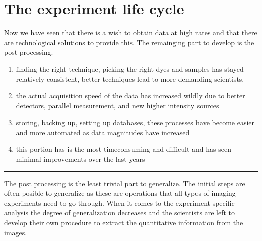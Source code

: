 \documentclass[letterpaper,10pt,english]{sphinxmanual}
\begin{document}
\section{The experiment life cycle}
\label{\detokenize{01-Introduction:the-experiment-life-cycle}}
\sphinxAtStartPar
Now we have seen that there is a wish to obtain data at high rates and that there are technological solutions to provide this. The remainging part to develop is the post processing.
\begin{enumerate}
%
\item {} 
\sphinxAtStartPar
{} finding the right technique, picking the right dyes and samples has stayed relatively consistent, better techniques lead to more demanding scientists.

\item {} 
\sphinxAtStartPar
{} the actual acquisition speed of the data has increased wildly due to better detectors, parallel measurement, and new higher intensity sources

\item {} 
\sphinxAtStartPar
{} storing, backing up, setting up databases, these processes have become easier and more automated as data magnitudes have increased

\item {} 
\sphinxAtStartPar
{} this portion has is the most time\sphinxhyphen{}consuming and difficult and has seen minimal improvements over the last years

\end{enumerate}


\bigskip\hrule\bigskip


\sphinxAtStartPar
The post processing is the least trivial part to generalize. The initial steps are often posible to generalize as these are operations that all types of imaging experiments need to go through. When it comes to the experiment specific analysis the degree of generalization decreases and the scientists are left to develop their own procedure to extract the quantitative information from the images.
\end{document}
